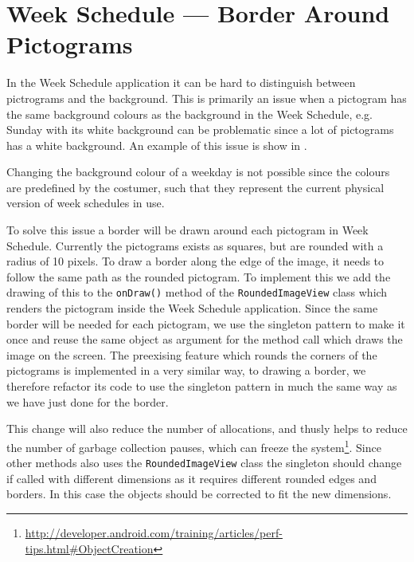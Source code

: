 \section{Week Schedule --- Border Around Pictograms}\label{sec:borders}
\begin{center}
\end{center}

In the Week Schedule application it can be hard to distinguish between pictrograms and the background.
This is primarily an issue when a pictogram has the same background colours as the background in the Week Schedule, e.g. Sunday with its white background can be problematic since a lot of pictograms has a white background.
An example of this issue is show in  .

Changing the background colour of a weekday is not possible since the colours are predefined by the costumer, such that they represent the current physical version of week schedules in use.

To solve this issue a border will be drawn around each pictogram in Week Schedule.
Currently the pictograms exists as squares, but are rounded with a radius of 10 pixels.
To draw a border along the edge of the image, it needs to follow the same path as the rounded pictogram.
To implement this we add the drawing of this to the \texttt{onDraw()} method of the \texttt{RoundedImageView} class which renders the pictogram inside the Week Schedule application.
Since the same border will be needed for each pictogram, we use the singleton pattern to make it once and reuse the same object as argument for the method call which draws the image on the screen.
The preexising feature which rounds the corners of the pictograms is implemented in a very similar way, to drawing a border, we therefore refactor its code to use the singleton pattern in much the same way as we have just done for the border.

This change will also reduce the number of allocations, and  thusly helps to reduce the number of garbage collection pauses, which can freeze the system\footnote{\url{http://developer.android.com/training/articles/perf-tips.html\#ObjectCreation}}.
Since other methods also uses the \texttt{RoundedImageView} class the singleton should change if called with different dimensions as it requires different rounded edges and borders.
In this case the objects should be corrected to fit the new dimensions.

